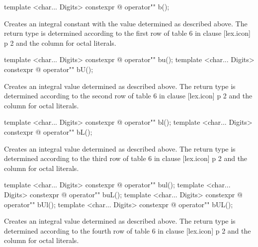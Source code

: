 \documentclass[ebook,11pt,article]{memoir}
\begin{document}
\begin{itemdecl}
template <char... Digits>
constexpr @\seebelow@ 
operator"" b();
\end{itemdecl}

\begin{itemdescr}
\pnum
\effects
Creates an integral constant with the value determined as described above. The return type is determined according to the first row of table 6 in clause [lex.icon] p 2 and the column for octal literals. 
\end{itemdescr}

\begin{itemdecl}
template <char... Digits>
constexpr @\seebelow@ 
operator"" bu();
template <char... Digits>
constexpr @\seebelow@ 
operator"" bU();
\end{itemdecl}

\begin{itemdescr}
\pnum
\effects
Creates an integral value determined as described above. The return type is determined according to the second row of table 6 in clause [lex.icon] p 2 and the column for octal literals. 
\end{itemdescr}

\begin{itemdecl}
template <char... Digits>
constexpr @\seebelow@ 
operator"" bl();
template <char... Digits>
constexpr @\seebelow@ 
operator"" bL();
\end{itemdecl}

\begin{itemdescr}
\pnum
\effects
Creates an integral value determined as described above. The return type is determined according to the third row of table 6 in clause [lex.icon] p 2 and the column for octal literals. 
\end{itemdescr}

\begin{itemdecl}
template <char... Digits>
constexpr @\seebelow@ 
operator"" bul();
template <char... Digits>
constexpr @\seebelow@ 
operator"" buL();
template <char... Digits>
constexpr @\seebelow@ 
operator"" bUl();
template <char... Digits>
constexpr @\seebelow@ 
operator"" bUL();
\end{itemdecl}

\begin{itemdescr}
\pnum
\effects
Creates an integral value determined as described above. The return type is determined according to the fourth row of table 6 in clause [lex.icon] p 2 and the column for octal literals. 
\end{itemdescr}
\end{document}
